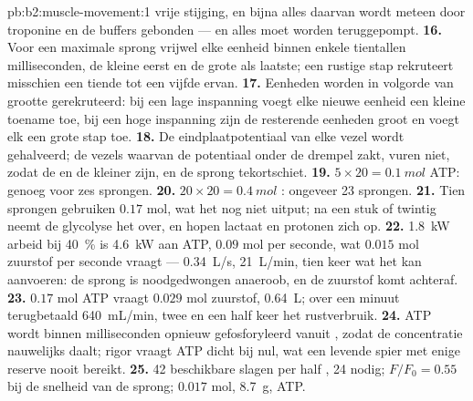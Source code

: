 \begin{solution}{pb:b2:muscle-movement:1}
vrije stijging, en bijna alles daarvan wordt meteen door troponine en de
buffers gebonden --- en alles moet worden teruggepompt.
\textbf{16.} Voor een maximale sprong vrijwel elke eenheid binnen enkele
tientallen milliseconden, de kleine eerst en de grote als laatste; een
rustige stap rekruteert misschien een tiende tot een vijfde ervan.
\textbf{17.} Eenheden worden in volgorde van grootte gerekruteerd: bij een
lage inspanning voegt elke nieuwe eenheid een kleine toename toe, bij een
hoge inspanning zijn de resterende eenheden groot en voegt elk een grote stap
toe.
\textbf{18.} De eindplaatpotentiaal van elke vezel wordt gehalveerd; de
vezels waarvan de potentiaal onder de drempel zakt, vuren niet, zodat de
 en de  kleiner zijn, en de sprong tekortschiet.
\textbf{19.} $5\times 20 = \qty{0.1}{mol}$ ATP: genoeg voor zes sprongen.
\textbf{20.} $20\times 20 = \qty{0.4}{mol}$ :
ongeveer 23 sprongen.
\textbf{21.} Tien sprongen gebruiken $0.17$ mol, wat het  nog
niet uitput; na een stuk of twintig neemt de glycolyse het over, en hopen
lactaat en protonen zich op.
\textbf{22.} \qty{1.8}{kW} arbeid bij \qty{40}{\%} is \qty{4.6}{kW} aan
ATP, $0.09$ mol per seconde, wat $0.015$ mol zuurstof per seconde vraagt ---
\qty{0.34}{L/s}, \qty{21}{L/min}, tien keer wat het  kan aanvoeren:
de sprong is noodgedwongen anaeroob, en de zuurstof komt achteraf.
\textbf{23.} $0.17$ mol ATP vraagt $0.029$ mol zuurstof,
\qty{0.64}{L}; over een minuut terugbetaald \qty{640}{mL/min}, twee en een
half keer het rustverbruik.
\textbf{24.} ATP wordt binnen milliseconden opnieuw gefosforyleerd vanuit
, zodat de concentratie nauwelijks daalt; rigor vraagt ATP
dicht bij nul, wat een levende spier met enige reserve nooit bereikt.
\textbf{25.} 42 beschikbare slagen per half , 24 nodig;
$F/F_0 = 0.55$ bij de snelheid van de sprong; $0.017$ mol, \qty{8.7}{g}, ATP.
\end{solution}
